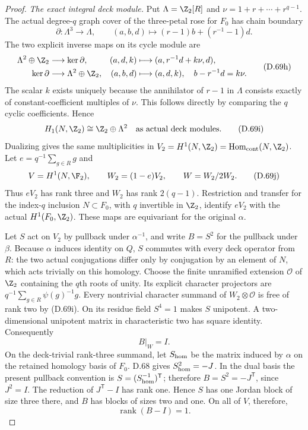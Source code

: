 \begin{proof}
\emph{The exact integral deck module.}
Put $\Lambda=\Z_2[R]$ and $\nu=1+r+\cdots+r^{q-1}$.
The actual degree-$q$ graph cover of the three-petal rose
for $F_0$ has chain boundary
\[
 \partial:\Lambda^3\longrightarrow\Lambda,\qquad
       (a,b,d)\longmapsto(r-1)b+(r^{-1}-1)d .
                                                               \tag{D.69g}
\]
The two explicit inverse maps on its cycle module are
\[
 \begin{aligned}
 \Lambda^2\oplus\Z_2&\longrightarrow\ker\partial,
       &(a,d,k)&\longmapsto(a,r^{-1}d+k\nu,d),\\
 \ker\partial&\longrightarrow\Lambda^2\oplus\Z_2,
       &(a,b,d)&\longmapsto(a,d,k),
       \quad b-r^{-1}d=k\nu .
 \end{aligned}                                               \tag{D.69h}
\]
The scalar $k$ exists uniquely because the annihilator of
$r-1$ in $\Lambda$ consists exactly of constant-coefficient
multiples of $\nu$. This follows directly by comparing
the $q$ cyclic coefficients. Hence
\[
       H_1(N,\Z_2)\cong\Z_2\oplus\Lambda^2
                       \quad\text{as actual deck modules}. \tag{D.69i}
\]
Dualizing gives the same multiplicities in
$V_2=H^1(N,\Z_2)=\operatorname{Hom}_{\rm cont}(N,\Z_2)$.
Let $e=q^{-1}\sum_{g\in R}g$ and
\[
                V=H^1(N,\F_2),\qquad
                W_2=(1-e)V_2,\qquad W=W_2/2W_2 .
                                                               \tag{D.69j}
\]
Thus $eV_2$ has rank three and $W_2$ has rank $2(q-1)$.
Restriction and transfer for the index-$q$ inclusion
$N\subset F_0$, with $q$ invertible in $\Z_2$, identify
$eV_2$ with the actual $H^1(F_0,\Z_2)$. These maps are
equivariant for the original $\alpha$.

Let $S$ act on $V_2$ by pullback under $\alpha^{-1}$, and
write $B=S^2$ for the pullback under $\beta$.
Because $\alpha$ induces identity on $Q$, $S$ commutes
with every deck operator from $R$: the two actual
conjugations differ only by conjugation by an element
of $N$, which acts trivially on this homology.
Choose the finite unramified extension $\mathcal O$ of
$\Z_2$ containing the $q$th roots of unity. Its explicit
character projectors are
$q^{-1}\sum_{g\in R}\psi(g)^{-1}g$.
Every nontrivial character summand of
$W_2\otimes\mathcal O$ is free of rank two by (D.69i).
On its residue field $S^4=1$ makes $S$ unipotent.
A two-dimensional unipotent matrix in characteristic
two has square identity. Consequently
\[
                          B|_W=I.                          \tag{D.69k}
\]
On the deck-trivial rank-three summand, let
$S_{\rm hom}$ be the matrix induced by $\alpha$
on the retained homology basis of $F_0$.
D.68 gives $S_{\rm hom}^2=-J$.
In the dual basis the present pullback convention is
$S=(S_{\rm hom}^{-1})^{\mathsf T}$; therefore
$B=S^2=-J^{\mathsf T}$, since $J^2=I$.
The reduction of $J^{\mathsf T}-I$ has rank one.
Hence $S$ has one Jordan block of size three there,
and $B$ has blocks of sizes two and one.
On all of $V$, therefore,
\[
                   \operatorname{rank}(B-I)=1.             \tag{D.69l}
\]


\end{proof}
